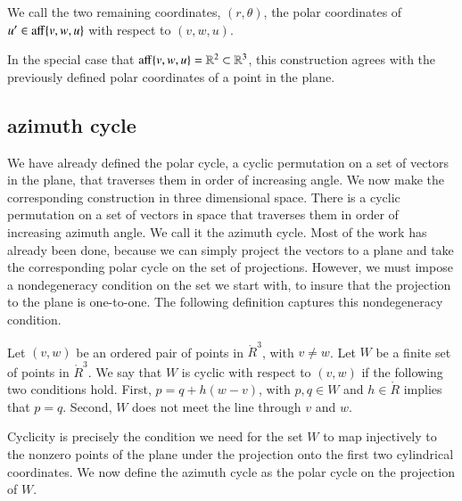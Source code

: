 \begin{definition}\label{def:polar}
We call  the two remaining coordinates, $(r,\theta)$, 
the polar coordinates of $u'\in{\operatorname{aff}}\{v,w,u\}$ with
respect to $(v,w,u)$.
\end{definition}

In the special case that ${\operatorname{aff}}\{v,w,u\}=\mathbb{R}^2\subset \mathbb{R}^3$, this
construction agrees with the previously defined polar coordinates of a point in
the plane.

\subsection{azimuth cycle}

We have already defined the polar cycle, a cyclic permutation on a set
of vectors in the plane, that traverses them in order of increasing
angle.  We now make the corresponding construction in three dimensional
space.  There is  a cyclic permutation on a set of vectors in space
that traverses them in order of increasing azimuth angle.  We call it
the azimuth cycle.  Most of the work has already been done, because we
can simply project the vectors to a plane and take the corresponding
polar cycle on the set of projections.  However, we must impose
a nondegeneracy condition on the set we start with, to insure that
the projection to the plane is one-to-one.  The following
definition captures this nondegeneracy condition.


\begin{definition} Let $(v,w)$ be an ordered pair of points in
$\ring{R}^3$, with $v\ne w$.
Let $W$ be a finite set of points in $\ring{R}^3$.
We say that $W$ is cyclic with respect to $(v,w)$ if
the following two conditions hold.
First, $p = q + h (w-v)$, with $p,q\in W$ and $h\in \ring{R}$
implies that $p=q$.  Second, $W$ does not meet the line
through $v$ and $w$.
\end{definition}

Cyclicity is precisely the condition we need for the
set $W$ to map injectively to the nonzero points of the 
plane under the projection
onto the first two cylindrical coordinates.  We now define
the azimuth cycle as the polar cycle on the projection of $W$.



